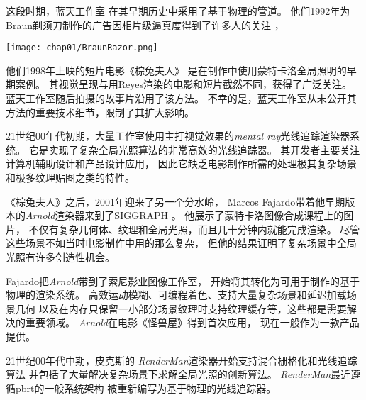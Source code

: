 这段时期，蓝天工作室
在其早期历史中采用了基于物理的管道\citep{ohmer1997}。
他们1992年为Braun剃须刀制作的广告因相片级逼真度得到了许多人的关注
，
\begin{marginfigure}[-170pt]
    \texttt{[image: chap01/BraunRazor.png]}
\end{marginfigure}
他们1998年上映的短片电影《棕兔夫人》
是在制作中使用蒙特卡洛全局照明的早期案例。
其视觉呈现与用Reyes渲染的电影和短片截然不同，获得了广泛关注。
蓝天工作室随后拍摄的故事片沿用了该方法。
不幸的是，蓝天工作室从未公开其方法的重要技术细节，限制了其扩大影响。

21世纪00年代初期，大量工作室使用主打视觉效果的\emph{mental ray}光线追踪渲染器系统。
它是实现了复杂全局光照算法的非常高效的光线追踪器。
其开发者主要关注计算机辅助设计和产品设计应用，
因此它缺乏电影制作所需的处理极其复杂场景和极多纹理贴图之类的特性。

《棕兔夫人》之后，2001年迎来了另一个分水岭，
Marcos Fajardo带着他早期版本的\emph{Arnold}渲染器来到了SIGGRAPH
。
他展示了蒙特卡洛图像合成课程上的图片，
不仅有复杂几何体、纹理和全局光照，而且几十分钟内就能完成渲染。
尽管这些场景不如当时电影制作中用的那么复杂，
但他的结果证明了复杂场景中全局光照有许多创造性机会。

Fajardo把\emph{Arnold}带到了索尼影业图像工作室，
开始将其转化为可用于制作的基于物理的渲染系统。
高效运动模糊、可编程着色、支持大量复杂场景和延迟加载场景几何
以及在内存只保留一小部分场景纹理时支持纹理缓存等，这些都是需要解决的重要领域。
\emph{Arnold}在电影《怪兽屋》得到首次应用，
现在一般作为一款产品提供。

21世纪00年代中期，皮克斯的
\emph{RenderMan}渲染器开始支持混合栅格化和光线追踪算法
并包括了大量解决复杂场景下求解全局光照的创新算法。
\emph{RenderMan}最近遵循pbrt的一般系统架构\citep{10.1145/2776880.2792699}
被重新编写为基于物理的光线追踪器。

